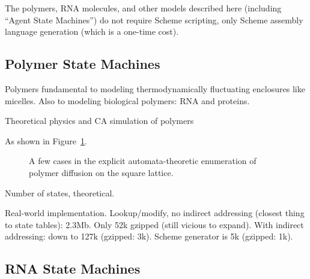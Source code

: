 \documentclass{acm_proc_article-sp}
\begin{document}
The polymers, RNA molecules, and other models described here (including ``Agent State Machines'') do not require Scheme scripting, only Scheme assembly language generation (which is a one-time cost).

\subsection{Polymer State Machines}

Polymers fundamental to modeling thermodynamically fluctuating enclosures like micelles.
Also to modeling biological polymers: RNA and proteins.

Theoretical physics \cite{DoiEdwards1988} and CA simulation of polymers \cite{PhysRevLett.64.1915,journals/pc/OstrovskyCSB01}

As shown in Figure~\ref{fig:polymer}.

\begin{figure}
\caption{
\label{fig:polymer}
A few cases in the explicit automata-theoretic enumeration of polymer diffusion on the square lattice.
}
\end{figure}

Number of states, theoretical.

Real-world implementation.
Lookup/modify, no indirect addressing (closest thing to state tables): 2.3Mb.
Only 52k gzipped (still vicious to expand).
With indirect addressing: down to 127k (gzipped: 3k).
Scheme generator is 5k (gzipped: 1k).


\subsection{RNA State Machines}
\end{document}
